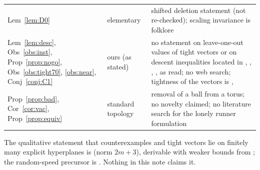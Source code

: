 \documentclass[11pt]{article}
\theoremstyle{remark}
\begin{document}
\begin{center}
\begin{tabular}{@{}p{3.1cm}p{1.9cm}p{6.2cm}@{}}
Lem~\ref{lem:D0} & elementary & shifted deletion statement \cite[Lemma~7.14]{Zhang26} (not re-checked); scaling invariance is folklore\\
Lem~\ref{lem:desc}, Obs~\ref{obs:inst}, Prop~\ref{prop:nogo}, Obs~\ref{obs:tight70}, \ref{obs:near}, Conj~\ref{conj:C1} & ours (as stated) & no statement on leave-one-out values of tight vectors or on descent inequalities located in \cite{GK25}, \cite{Cordella26}, \cite{Zhang26}, \cite{BE26}, \cite{Cz12} as read; no web search; tightness of the vectors is \cite[Thm.~3.1]{GW06}, \cite{Zhang26}\\
Prop~\ref{prop:bad}, Cor~\ref{cor:vac}, Prop~\ref{prop:equiv} & standard topology & removal of a ball from a torus; no novelty claimed; no literature search for the lonely runner formulation\\
\bottomrule
\end{tabular}
\end{center}

\noindent The qualitative statement that counterexamples and tight vectors lie on finitely many explicit hyperplanes is \cite[Thm.~1.1, 2.1]{BE26} (norm $2m+3$), derivable with weaker bounds from \cite{GK25}; the random-speed precursor is \cite{Cz12}. Nothing in this note claims it.



\end{document}
